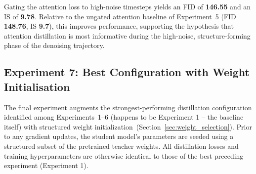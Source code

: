 \FloatBarrier

Gating the attention loss to high-noise timesteps yields an FID of
\textbf{146.55} and an IS of \textbf{9.78}. Relative to the ungated
attention baseline of Experiment~5 (FID \textbf{148.76}, IS \textbf{9.7}),
this improves performance, supporting
the hypothesis that attention distillation is most informative during the
high-noise, structure-forming phase of the denoising trajectory.


\subsection{Experiment 7: Best Configuration with Weight Initialisation}
\label{subsec:exp7}

The final experiment augments the strongest-performing distillation
configuration identified among Experiments~1--6 (happens to be Experiment 1 -- the baseline itself) with structured weight
initialization~(Section~\ref{sec:weight_selection}).
Prior to any gradient updates, the student model's parameters are seeded
using a structured subset of the pretrained teacher weights. All distillation losses and training
hyperparameters are otherwise identical to those of the best preceding
experiment (Experiment 1).

